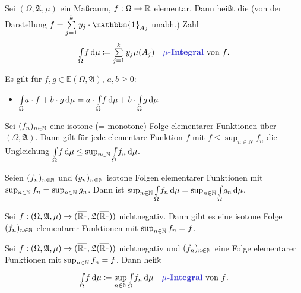 \documentclass{cheat-sheet}
\newcommand{\Alg}{\mathfrak{A}} %
\newcommand{\LebAlg}{\mathfrak{L}} %
\newcommand{\E}{\mathbb{E}} %
\newcommand{\ind}{\mathbbm{1}} %
\renewcommand{\ER}{\overline{\R^1}} %
\newcommand{\IntOmu}[1]{\Int{\Omega}{}{#1}{\mu}} %
\begin{document}
\begin{defn}
  Sei $(\Omega, \Alg, \mu)$ ein Maßraum, $f : \Omega \to \mathbb{R}$ elementar. Dann heißt die (von der Darstellung $f = \sum_{j=1}^k y_j \cdot \ind_{A_j}$ unabh.) Zahl
  \[ \IntOmu{f} \coloneqq \sum_{j=1}^k y_j \mu(A_j) \quad \text{\emph{$\mu$-Integral} von $f$.} \]
\end{defn}

\begin{satz}
  Es gilt für $f, g \in \E(\Omega, \Alg)$, $a, b \geq 0$:
  \begin{itemize}
    \miniitem{0.3\linewidth}{$\IntOmu{\ind_A} = \mu(A)$}
    \miniitem{0.5\linewidth}{$f \leq g \implies \IntOmu{f} \leq \IntOmu{g}$}
    \item $\IntOmu{a \cdot f + b \cdot g} = a \cdot \IntOmu{f} + b \cdot \IntOmu{g}$
  \end{itemize}
\end{satz}


\begin{satz}
  Sei $(f_n)_{n \in \mathbb{N}}$ eine isotone (= monotone) Folge elementarer Funktionen über $(\Omega, \Alg)$. Dann gilt für jede elementare Funktion $f$ mit $f \leq \sup_{n \in N} f_n$ die Ungleichung $\IntOmu{f} \leq \sup_{n \in \N} \IntOmu{f_n}$.
\end{satz}

\begin{korollar}
  Seien $(f_n)_{n \in \mathbb{N}}$ und $(g_n)_{n \in \mathbb{N}}$ isotone Folgen elementarer Funktionen mit $\sup_{n \in \mathbb{N}} f_n = \sup_{n \in \mathbb{N}} g_n$. Dann ist $\sup_{n \in \N} \IntOmu{f_n} = \sup_{n \in \N} \IntOmu{g_n}$.
\end{korollar}

\begin{satz}
  Sei $f : (\Omega, \Alg, \mu) \to (\ER, \LebAlg(\ER))$ nichtnegativ. Dann gibt es eine isotone Folge $(f_n)_{n \in \mathbb{N}}$ elementarer Funktionen mit $\sup_{n \in \mathbb{N}} f_n = f$.
\end{satz}

\begin{defn}
  Sei $f : (\Omega, \Alg, \mu) \to (\ER, \LebAlg(\ER))$ nichtnegativ und $(f_n)_{n \in \mathbb{N}}$ eine Folge elementarer Funktionen mit $\sup_{n \in \mathbb{N}} f_n = f$. Dann heißt
  \[ \IntOmu{f} \coloneqq \sup_{n \in \N} \IntOmu{f_n} \quad \text{\emph{$\mu$-Integral} von $f$.} \]
\end{defn}

\end{document}

